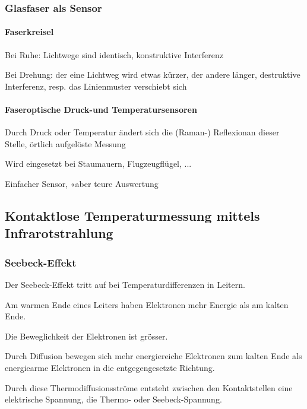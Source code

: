 \subsubsection{Glasfaser als Sensor}
\begin{multicols}{2}
    \paragraph{Faserkreisel}
    \begin{compactitem}
        \item Bei Ruhe: Lichtwege sind identisch, konstruktive Interferenz
        \item Bei Drehung: der eine Lichtweg wird etwas kürzer, der andere länger, destruktive Interferenz, resp. das Linienmuster verschiebt sich
    \end{compactitem}
    
    \paragraph{Faseroptische Druck-und Temperatursensoren}
    \begin{compactitem}
        \item Durch Druck oder Temperatur ändert sich die (Raman-) Reflexionan dieser Stelle, örtlich aufgelöste Messung
        \item Wird eingesetzt bei Staumauern, Flugzeugflügel, ...
        \item Einfacher Sensor, «aber teure Auswertung
    \end{compactitem}
\end{multicols}

\subsection{Kontaktlose Temperaturmessung mittels Infrarotstrahlung}
\subsubsection{Seebeck-Effekt}
\begin{compactitem}
    \item Der Seebeck-Effekt tritt auf bei Temperaturdifferenzen in Leitern.
    \item Am warmen Ende eines Leiters haben Elektronen mehr Energie als am kalten Ende.
    \item Die Beweglichkeit der Elektronen ist grösser.
    \item Durch Diffusion bewegen sich mehr energiereiche Elektronen zum kalten Ende als energiearme Elektronen in die entgegengesetzte Richtung.
    \item Durch diese Thermodiffusionsströme entsteht zwischen den Kontaktstellen eine elektrische Spannung, die Thermo- oder Seebeck-Spannung.
\end{compactitem}


